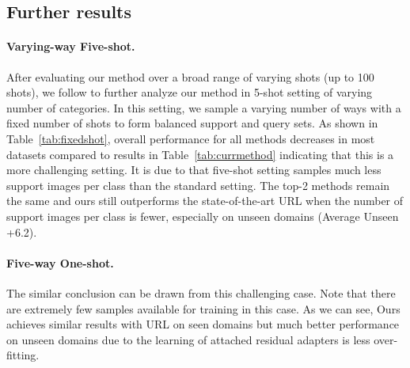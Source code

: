 \subsection{Further results}
\vspace{-0.15cm}
\paragraph{Varying-way Five-shot.}
After evaluating our method over a broad range of varying shots (\eg up to 100 shots), we follow \cite{doersch2020crosstransformers,li2021universal} to further analyze our method in 5-shot setting of varying number of categories.
In this setting, we sample a varying number of ways with a fixed number of shots to form balanced support and query sets. As shown in Table~\ref{tab:fixedshot}, overall performance for all methods decreases in most datasets compared to results in Table~\ref{tab:currmethod} indicating that this is a more challenging setting. It is due to that five-shot setting samples much less support images per class than the standard setting. 
The top-2 methods remain the same and ours still outperforms the state-of-the-art URL when the number of support images per class is fewer, especially on unseen domains (Average Unseen +6.2).

\paragraph{Five-way One-shot.}
The similar conclusion can be drawn from this challenging case. Note that there are extremely few samples available for training in this case. As we can see, Ours achieves similar results with URL on seen domains but much better performance on unseen domains due to the learning of attached residual adapters is less over-fitting.

